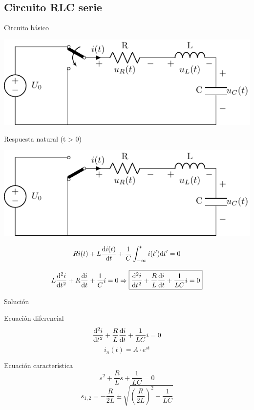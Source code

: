 \documentclass[aspectratio=169, usenames,svgnames,dvipsnames]{beamer}
\begin{document}
\subsection{Circuito RLC serie}
\label{sec:org6703f97}
\begin{frame}[label={sec:orgcb160d7}]{Circuito básico}
\begin{center}
\includegraphics[width=.9\linewidth]{../figs/transitorio_circuitoRLC_serie.pdf}
\end{center}
\end{frame}
\begin{frame}[label={sec:org77f5d2b}]{Respuesta natural (t > 0)}
\begin{center}
\includegraphics[height=0.45\textheight]{../figs/transitorio_circuitoRLC_serie_t0+.pdf}
\end{center}

\[
  Ri(t) + L\diff{i(t)}{t} + \frac{1}{C}\int_{-\infty}^t i(t') \mathrm{d}t' = 0
\]

\[
  L\diff[2]{i}{t} + R\diff{i}{t} + \frac{1}{C} i = 0 \Rightarrow
  \boxed{\diff[2]{i}{t} + \frac{R}{L} \diff{i}{t} + \frac{1}{LC} i = 0}
\]
\end{frame}
\begin{frame}[label={sec:org30ec235}]{Solución}
\begin{block}{Ecuación diferencial}
\[
\diff[2]{i}{t} + \frac{R}{L} \diff{i}{t} + \frac{1}{LC} i = 0
\]
\[
    i_n(t) = A \cdot e^{s t}
\]
\end{block}
\begin{block}{Ecuación característica}
\[
s^2 + \frac{R}{L} s + \frac{1}{LC} = 0  
\]
\[
  s_{1,2} = -\frac{R}{2L} \pm \sqrt{\left(\frac{R}{2L}\right)^2 - \frac{1}{LC}}
\]
\end{block}
\end{frame}
\end{document}
